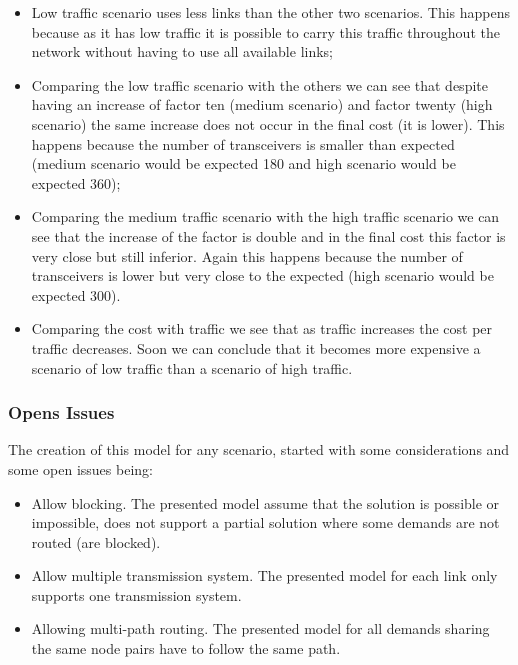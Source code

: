 \begin{itemize}
  \item Low traffic scenario uses less links than the other two scenarios. This happens because as it has low traffic it is possible to carry this traffic throughout the network without having to use all available links;
  \item Comparing the low traffic scenario with the others we can see that despite having an increase of factor ten (medium scenario) and factor twenty (high scenario) the same increase does not occur in the final cost (it is lower). This happens because the number of transceivers is smaller than expected (medium scenario would be expected 180 and high scenario would be expected 360);
  \item Comparing the medium traffic scenario with the high traffic scenario we can see that the increase of the factor is double and in the final cost this factor is very close but still inferior. Again this happens because the number of transceivers is lower but very close to the expected (high scenario would be expected 300).
  \item Comparing the cost with traffic we see that as traffic increases the cost per traffic decreases. Soon we can conclude that it becomes more expensive a scenario of low traffic than a scenario of high traffic.
\end{itemize}


\vspace{13pt}
\subsubsection{Opens Issues}

The creation of this model for any scenario, started with some considerations and some open issues being:

\begin{itemize}
  \item Allow blocking.
  \subitem The presented model assume that the solution is possible or impossible, does not support a partial solution where some demands are not routed (are blocked).
  \item Allow multiple transmission system.
  \subitem The presented model for each link only supports one transmission system.
  \item Allowing multi-path routing.
  \subitem The presented model for all demands sharing the same node pairs have to follow the same path.
\end{itemize}

